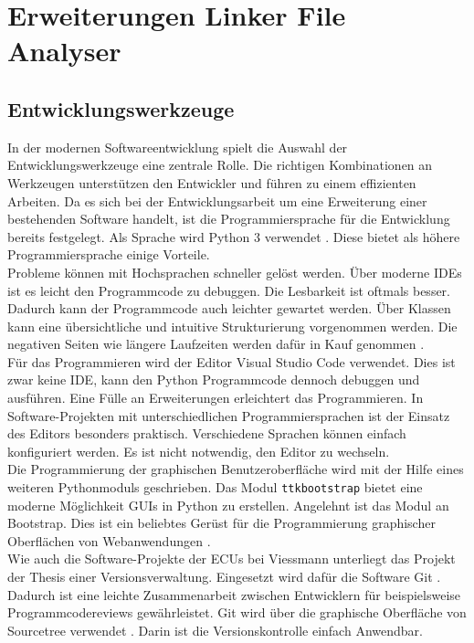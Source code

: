 \section{Erweiterungen Linker File Analyser}\label{kap:erweiterungen}

\subsection{Entwicklungswerkzeuge}\label{kap:entwicklungstools}
In der modernen Softwareentwicklung spielt die Auswahl der Entwicklungswerkzeuge eine zentrale Rolle.
Die richtigen Kombinationen an Werkzeugen unterstützen den Entwickler und führen zu einem effizienten Arbeiten.
Da es sich bei der Entwicklungsarbeit um eine Erweiterung einer bestehenden Software handelt, ist die Programmiersprache für die Entwicklung bereits festgelegt.
Als Sprache wird Python 3 verwendet \cite{inet:PythonOrg}.
Diese bietet als höhere Programmiersprache einige Vorteile. \\

Probleme können mit Hochsprachen schneller gelöst werden.
Über moderne \ac{IDE}s ist es leicht den Programmcode zu debuggen.
Die Lesbarkeit ist oftmals besser.
Dadurch kann der Programmcode auch leichter gewartet werden.
Über Klassen kann eine übersichtliche und intuitive Strukturierung vorgenommen werden.
Die negativen Seiten wie längere Laufzeiten werden dafür in Kauf genommen \cite{Watson2017}.\\

Für das Programmieren wird der Editor Visual Studio Code \cite{inet:vscode} verwendet.
Dies ist zwar keine \ac{IDE}, kann den Python Programmcode dennoch debuggen und ausführen.
Eine Fülle an Erweiterungen erleichtert das Programmieren.
In Software-Projekten mit unterschiedlichen Programmiersprachen ist der Einsatz des Editors besonders praktisch.
Verschiedene Sprachen können einfach konfiguriert werden.
Es ist nicht notwendig, den Editor zu wechseln.\\

Die Programmierung der graphischen Benutzeroberfläche wird mit der Hilfe eines weiteren Pythonmoduls geschrieben.
Das Modul \verb*|ttkbootstrap| \cite{inet:ttkbootstrap} bietet eine moderne Möglichkeit \ac{GUI}s in Python zu erstellen.
Angelehnt ist das Modul an Bootstrap.
Dies ist ein beliebtes Gerüst für die Programmierung graphischer Oberflächen von Webanwendungen \cite{inet:bootstrap}. \\

Wie auch die Software-Projekte der \acs{ECU}s bei Viessmann unterliegt das Projekt der Thesis einer Versionsverwaltung.
Eingesetzt wird dafür die Software Git \cite{inet:git}.
Dadurch ist eine leichte Zusammenarbeit zwischen Entwicklern für beispielsweise Programmcodereviews gewährleistet.
Git wird über die graphische Oberfläche von Sourcetree verwendet \cite{inet:sourcetree}.
Darin ist die Versionskontrolle einfach Anwendbar. \\

